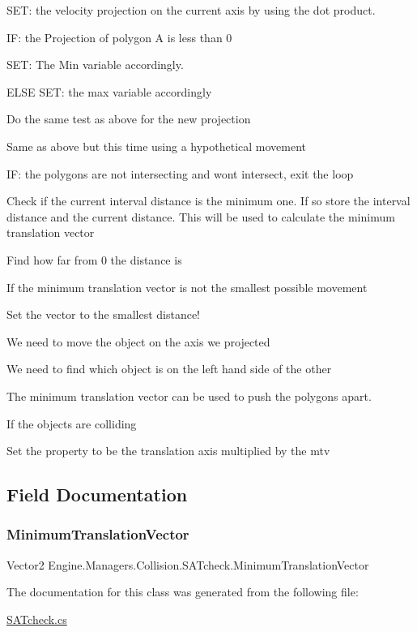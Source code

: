 S\+ET\+: the velocity projection on the current axis by using the dot product.

IF\+: the Projection of polygon A is less than 0

S\+ET\+: The Min variable accordingly.

E\+L\+SE S\+ET\+: the max variable accordingly

Do the same test as above for the new projection

Same as above but this time using a hypothetical movement

IF\+: the polygons are not intersecting and won\textquotesingle{}t intersect, exit the loop

Check if the current interval distance is the minimum one. If so store the interval distance and the current distance. This will be used to calculate the minimum translation vector

Find how far from 0 the distance is

If the minimum translation vector is not the smallest possible movement

Set the vector to the smallest distance!

We need to move the object on the axis we projected

We need to find which object is on the left hand side of the other

The minimum translation vector can be used to push the polygons apart.

If the objects are colliding

Set the property to be the translation axis multiplied by the mtv 

\subsection{Field Documentation}
\mbox{\label{a00510_a307c7f32a47949b280ac2a9d7b174899}} 
\subsubsection{\texorpdfstring{Minimum\+Translation\+Vector}{MinimumTranslationVector}}
{\footnotesize\ttfamily Vector2 Engine.\+Managers.\+Collision.\+S\+A\+Tcheck.\+Minimum\+Translation\+Vector}



The documentation for this class was generated from the following file\+:\begin{DoxyCompactItemize}
\item 
\hyperlink{a00164}{S\+A\+Tcheck.\+cs}\end{DoxyCompactItemize}
